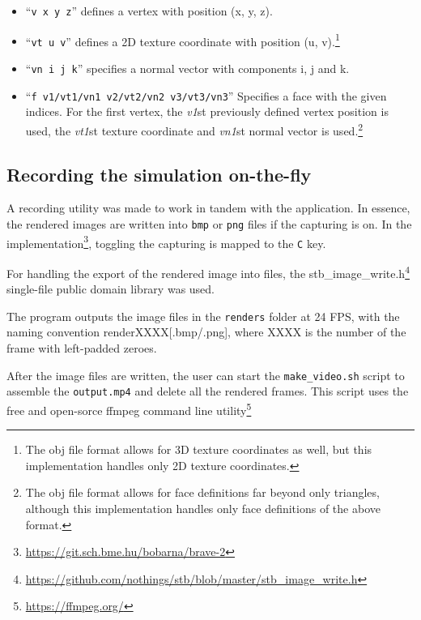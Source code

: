 \documentclass[sigplan,screen,nonacm]{acmart}
\begin{document}
\newcommand{\vtFootNote}{\footnote{The obj file format allows for 3D texture
coordinates as well, but this implementation handles only 2D texture
coordinates.}}

\newcommand{\fFootNote}{\footnote{The obj file format allows for face
definitions far beyond only triangles, although this implementation handles only
face definitions of the above format.}}

\begin{itemize}
    \item ``\verb|v x y z|'' defines a vertex with position (x, y, z).\vFootNote 
    \item ``\verb|vt u v|'' defines a 2D texture coordinate with position (u,
        v).\vtFootNote 
    \item ``\verb|vn i j k|'' specifies a normal vector with components i, j and
        k.  
    \item ``\verb|f v1/vt1/vn1 v2/vt2/vn2 v3/vt3/vn3|'' Specifies a face with the
        given indices. For the first vertex, the \textit{v1}st previously
        defined vertex position is used, the \textit{vt1}st texture coordinate
        and \textit{vn1}st normal vector is used.\fFootNote
\end{itemize}


\subsection{Recording the simulation on-the-fly}
A recording utility was made to work in tandem with the application. In essence,
the rendered images are written into \texttt{bmp} or \texttt{png} files if the
capturing is on. In the
implementation\footnote{\url{https://git.sch.bme.hu/bobarna/brave-2}}, toggling
the capturing is mapped to the \texttt{C} key.


For handling the export of the rendered image into files, the
stb\_image\_write.h\footnote{\url{https://github.com/nothings/stb/blob/master/stb\_image\_write.h}}
single-file public domain library was used. 


The program outputs the image files in the \texttt{renders} folder at 24 FPS,
with the naming convention renderXXXX[.bmp/.png], where XXXX is the number of
the frame with left-padded zeroes.


After the image files are written, the user can start the
\texttt{make\_video.sh} script to assemble the \texttt{output.mp4} and delete
all the rendered frames. This script uses the free and open-sorce ffmpeg command
line utility\footnote{\url{https://ffmpeg.org/}}
\end{document}
